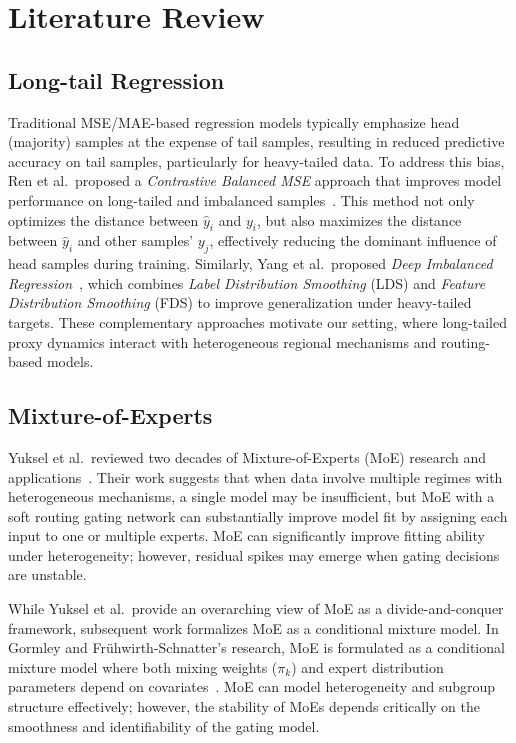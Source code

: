 \documentclass[preprint,12pt]{elsarticle}
\begin{document}
\section{Literature Review}
\subsection{Long-tail Regression}

Traditional MSE/MAE-based regression models typically emphasize head (majority) samples at the expense of tail samples, resulting in reduced predictive accuracy on tail samples, particularly for heavy-tailed data. To address this bias, Ren et al.\ proposed a \emph{Contrastive Balanced MSE} approach that improves model performance on long-tailed and imbalanced samples~\cite{ren2022balancedmse}. This method not only optimizes the distance between $\hat{y}_i$ and $y_i$, but also maximizes the distance between $\hat{y}_i$ and other samples' $y_j$, effectively reducing the dominant influence of head samples during training. Similarly, Yang et al.\ proposed \emph{Deep Imbalanced Regression}~\cite{yang2021dir}, which combines \emph{Label Distribution Smoothing} (LDS) and \emph{Feature Distribution Smoothing} (FDS) to improve generalization under heavy-tailed targets. These complementary approaches motivate our setting, where long-tailed proxy dynamics interact with heterogeneous regional mechanisms and routing-based models.

\subsection{Mixture-of-Experts}

Yuksel et al.\ reviewed two decades of Mixture-of-Experts (MoE) research and applications~\cite{yuksel2012twenty}. Their work suggests that when data involve multiple regimes with heterogeneous mechanisms, a single model may be insufficient, but MoE with a soft routing gating network can substantially improve model fit by assigning each input to one or multiple experts. MoE can significantly improve fitting ability under heterogeneity; however, residual spikes may emerge when gating decisions are unstable.

While Yuksel et al.\ provide an overarching view of MoE as a divide-and-conquer framework, subsequent work formalizes MoE as a conditional mixture model. In Gormley and Frühwirth-Schnatter's research, MoE is formulated as a conditional mixture model where both mixing weights ($\pi_k$) and expert distribution parameters depend on covariates~\cite{gormley2018moe}. MoE can model heterogeneity and subgroup structure effectively; however, the stability of MoEs depends critically on the smoothness and identifiability of the gating model.
\end{document}
